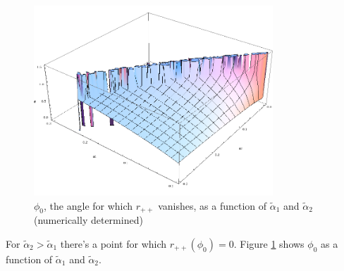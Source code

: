 \documentclass[11pt]{article}
\newcommand{\ta}{\tilde \alpha}
\begin{document}
\begin{figure}
    \begin{center}
        \includegraphics[width=0.8\textwidth]{rpp-zero-point.png}
    \end{center}
    \caption{$\phi_0$, the angle for which $r_{++}$ vanishes, as a
        function of $\ta_1$ and $\ta_2$ (numerically determined)}
    \label{fig:rpp-zero-point}    
\end{figure}

For $\ta_2 > \ta_1$ there's a point for which $r_{++}(\phi_0) =
0$. Figure \ref{fig:rpp-zero-point} shows $\phi_0$ as a function of
$\ta_1$ and $\ta_2$.
\end{document}
